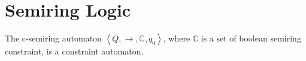 \section{Semiring Logic}

%















	
\begin{proposition}
The c-semiring automaton $\left\langle Q, \rightarrow, \mathbb{C}, q_{0} \right\rangle$, where $\mathbb{C}$ is a set of boolean semiring constraint, is a constraint automaton.
\end{proposition}


%


